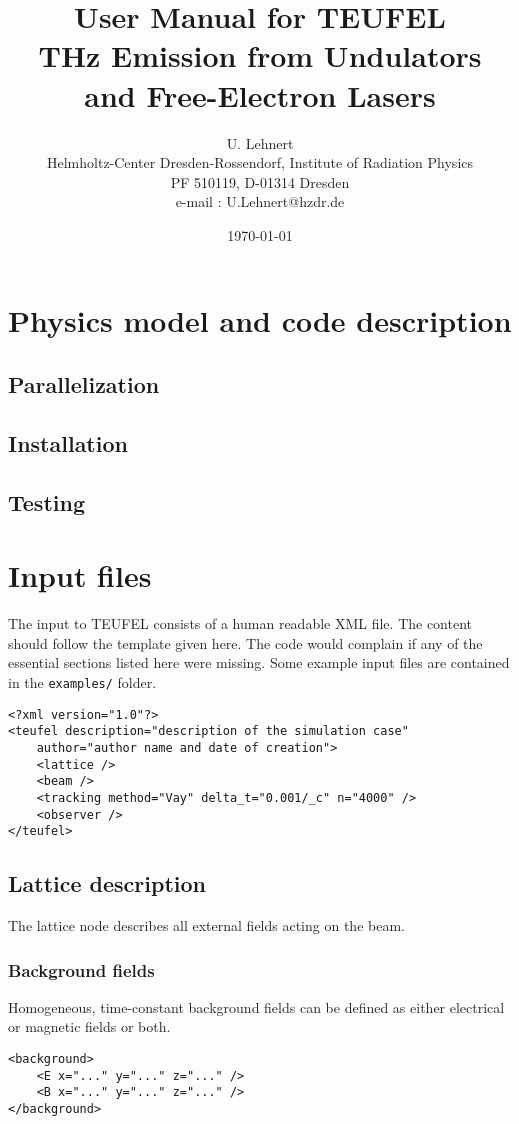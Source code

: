 \documentclass[11pt]{article}
\title{User Manual for TEUFEL \\ THz Emission from Undulators and Free-Electron Lasers}
\author{U. Lehnert\\
\footnotesize{Helmholtz-Center Dresden-Rossendorf, Institute of Radiation Physics}\\
\footnotesize{PF 510119, D-01314 Dresden}\\
\footnotesize{e-mail : U.Lehnert@hzdr.de}}
\date{\today\\[1cm]}
\begin{document}
\maketitle
\tableofcontents

\section{Physics model and code description}

\subsection{Parallelization}

\subsection{Installation}

\subsection{Testing}

\section{Input files}

The input to TEUFEL consists of a human readable XML file. The content should follow
the template given here. The code would complain if any of the essential sections
listed here were missing. Some example input files are contained in the \verb|examples/| folder.

\begin{lstlisting}
<?xml version="1.0"?>
<teufel description="description of the simulation case"
    author="author name and date of creation">
    <lattice />
    <beam />
    <tracking method="Vay" delta_t="0.001/_c" n="4000" />
    <observer />
</teufel>
\end{lstlisting}

\subsection{Lattice description}

The lattice node describes all external fields acting on the beam.

\subsubsection{Background fields}
Homogeneous, time-constant background fields can be defined as either electrical or magnetic
fields or both.
\begin{lstlisting}
<background>
    <E x="..." y="..." z="..." />
    <B x="..." y="..." z="..." />
</background>
\end{lstlisting}
\end{document}
